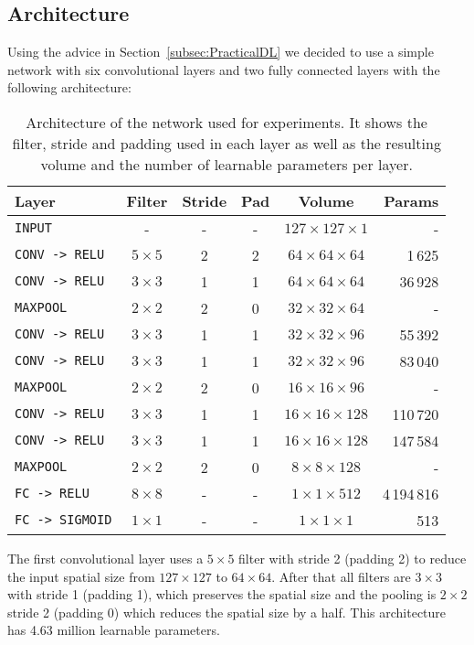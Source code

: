 \documentclass[11pt]{article}
\begin{document}
	\subsection{Architecture}
	Using the advice in Section~\ref{subsec:PracticalDL} we decided to use a simple network with six convolutional layers and two fully connected layers with the following architecture:
	\begin{table}[h]
		\centering
		\begin{tabular}{lccccr}
		\hline
		\textbf{Layer} & \textbf{Filter} & \textbf{Stride} &\textbf{Pad} & \textbf{Volume} & \textbf{Params} \\
		\hline
		\texttt{INPUT}	& -	& - & - & $127 \times 127 \times 1$ & -\\
		\texttt{CONV -> RELU} & $5 \times 5$ & 2 & 2 & $64 \times 64 \times 64$ & 1\,625\\
		\texttt{CONV -> RELU} & $3 \times 3$ & 1 & 1 & $64 \times 64 \times 64$ & 36\,928\\
		\texttt{MAXPOOL} & $2 \times 2$ & 2 & 0 & $32 \times 32 \times 64$ & -\\
		\texttt{CONV -> RELU} & $3 \times 3$ & 1 & 1 & $32 \times 32 \times 96$ & 55\,392\\
		\texttt{CONV -> RELU} & $3 \times 3$ & 1 & 1 & $32 \times 32 \times 96$ & 83\,040\\
		\texttt{MAXPOOL} & $2 \times 2$ & 2 & 0 & $16 \times 16 \times 96$ & -\\
		\texttt{CONV -> RELU} & $3 \times 3$ & 1 & 1 & $16 \times 16 \times 128$ & 110\,720\\
		\texttt{CONV -> RELU} & $3 \times 3$ & 1 & 1 & $16 \times 16 \times 128$ & 147\,584\\
		\texttt{MAXPOOL} & $2 \times 2$ & 2 & 0 & $8 \times 8 \times 128$ & -\\
		\texttt{FC -> RELU} & $8 \times 8$ & - & - & $1 \times 1 \times 512$ & 4\,194\,816\\
		\texttt{FC -> SIGMOID} & $1 \times 1$ & - & - & $1 \times 1 \times 1$ & 513 \\
		\hline
		\end{tabular}
		\label{tab:convNetArchitecture}
		\caption[Selected Convolutional Network Architecture]{Architecture of the network used for experiments. It shows the filter, stride and padding used in each layer as well as the resulting volume and the number of learnable parameters per layer.}
	\end{table}

	The first convolutional layer uses a $5 \times 5$ filter with stride 2 (padding 2) to reduce the input spatial size from $127 \times 127$ to $64 \times 64$. After that all filters are $3 \times 3$ with stride 1 (padding 1), which preserves the spatial size and the pooling is $2\times 2$ stride 2 (padding 0) which reduces the spatial size by a half. This architecture has 4.63 million learnable parameters. 
\end{document}
